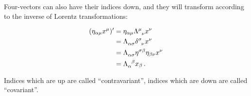 \documentclass[main.tex]{subfiles}
\begin{document}
Four-vectors can also have their indices down, and they will transform according to the inverse of Lorentz transformations:
  
\begin{subequations}
\begin{align}
(\eta_{\alpha\mu} x^\mu)' &=  \eta_{\alpha \mu} \tensor{\Lambda}{^\mu_\nu}x^\nu  \\
&= \tensor{\Lambda}{_\alpha_\sigma} \tensor{\delta}{^\sigma_\nu} x^\nu  \\
&= \tensor{\Lambda}{_\alpha_\sigma} \eta^{\sigma \beta} \eta_{\beta \nu} x^\nu  \\
&= \tensor{\Lambda}{_\alpha^\beta} x_\beta\,.
\end{align}
\end{subequations}

Indices which are up are called ``contravariant'', indices which are down are called ``covariant''.
\end{document}
